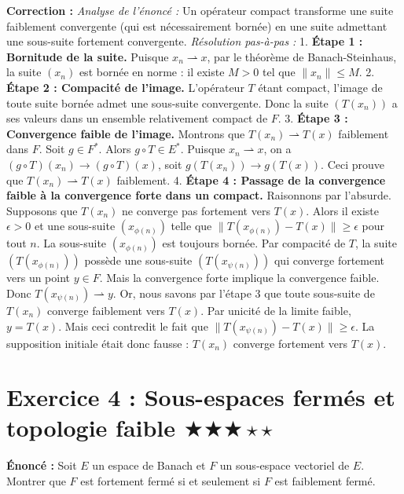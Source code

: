 \documentclass[11pt,a4paper]{article}
\begin{document}
\textbf{Correction :}
\textit{Analyse de l'énoncé :} Un opérateur compact transforme une suite faiblement convergente (qui est nécessairement bornée) en une suite admettant une sous-suite fortement convergente.
\textit{Résolution pas-à-pas :}
1. \textbf{Étape 1 : Bornitude de la suite.}
   Puisque $x_n \rightharpoonup x$, par le théorème de Banach-Steinhaus, la suite $(x_n)$ est bornée en norme : il existe $M > 0$ tel que $\|x_n\| \le M$.
2. \textbf{Étape 2 : Compacité de l'image.}
   L'opérateur $T$ étant compact, l'image de toute suite bornée admet une sous-suite convergente. Donc la suite $(T(x_n))$ a ses valeurs dans un ensemble relativement compact de $F$.
3. \textbf{Étape 3 : Convergence faible de l'image.}
   Montrons que $T(x_n) \rightharpoonup T(x)$ faiblement dans $F$. Soit $g \in F^*$. Alors $g \circ T \in E^*$.
   Puisque $x_n \rightharpoonup x$, on a $(g \circ T)(x_n) \to (g \circ T)(x)$, soit $g(T(x_n)) \to g(T(x))$.
   Ceci prouve que $T(x_n) \rightharpoonup T(x)$ faiblement.
4. \textbf{Étape 4 : Passage de la convergence faible à la convergence forte dans un compact.}
   Raisonnons par l'absurde. Supposons que $T(x_n)$ ne converge pas fortement vers $T(x)$.
   Alors il existe $\epsilon > 0$ et une sous-suite $(x_{\phi(n)})$ telle que $\|T(x_{\phi(n)}) - T(x)\| \ge \epsilon$ pour tout $n$.
   La sous-suite $(x_{\phi(n)})$ est toujours bornée. Par compacité de $T$, la suite $(T(x_{\phi(n)}))$ possède une sous-suite $(T(x_{\psi(n)}))$ qui converge fortement vers un point $y \in F$.
   Mais la convergence forte implique la convergence faible. Donc $T(x_{\psi(n)}) \rightharpoonup y$.
   Or, nous savons par l'étape 3 que toute sous-suite de $T(x_n)$ converge faiblement vers $T(x)$. Par unicité de la limite faible, $y = T(x)$.
   Mais ceci contredit le fait que $\|T(x_{\psi(n)}) - T(x)\| \ge \epsilon$.
   La supposition initiale était donc fausse : $T(x_n)$ converge fortement vers $T(x)$.


\section{Exercice 4 : Sous-espaces fermés et topologie faible \quad $\bigstar\bigstar\bigstar\star\star$}

\textbf{Énoncé :}
Soit $E$ un espace de Banach et $F$ un sous-espace vectoriel de $E$. Montrer que $F$ est fortement fermé si et seulement si $F$ est faiblement fermé.
\end{document}
